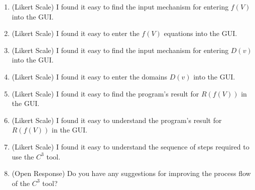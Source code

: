 \documentclass[12pt, titlepage]{article}
\newcommand{\prognameAbbrv}{$C^{3}$}
\begin{document}
\begin{enumerate}
	\item (Likert Scale) I found it easy to find the input mechanism for 
	entering $f(V)$ into the GUI.
	\item (Likert Scale) I found it easy to enter the $f(V)$ equations into the 
	GUI.
	\item (Likert Scale) I found it easy to find the input mechanism for 
	entering $D(v)$ into the GUI.
	\item (Likert Scale) I found it easy to enter the domains $D(v)$ into the 
	GUI.
	\item (Likert Scale) I found it easy to find the program's result for 
	$R(f(V))$ in the GUI.
	\item (Likert Scale) I found it easy to understand the program's result for 
	$R(f(V))$ in the GUI.
	\item (Likert Scale) I found it easy to understand the sequence of steps 
	required to use the \prognameAbbrv{} tool.
	\item (Open Response) Do you have any suggestions for improving the 
	process flow of the \prognameAbbrv{} tool?
\end{enumerate}
\end{document}
